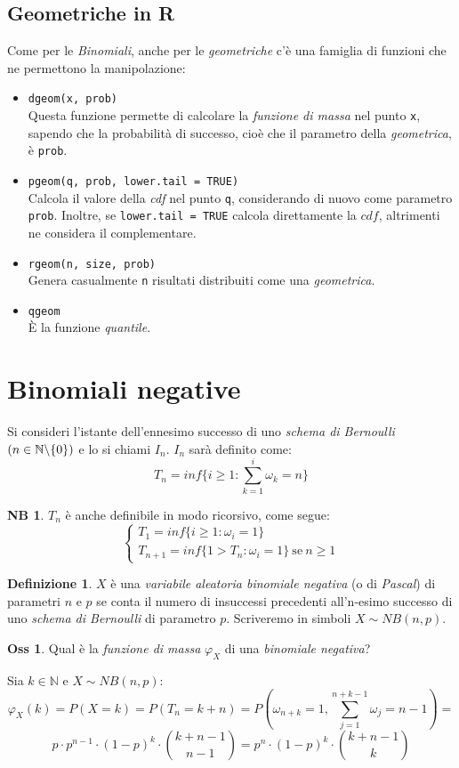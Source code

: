 \documentclass[12pt, a4paper]{report}
\theoremstyle{definition}
\newtheorem{definition}{Definizione}[section]
\newtheorem*{observation}{Oss}
\newtheorem*{note}{NB}
\DeclareRobustCommand{\N}{\mathbb{N}}%
\begin{document}
\subsection{Geometriche in R}
Come per le \emph{Binomiali}, anche per le \emph{geometriche} c'è una famiglia di
funzioni che ne permettono la manipolazione:
\begin{itemize}
	\item \texttt{dgeom(x, prob)}\\
	Questa funzione permette di calcolare la \emph{funzione di massa} nel punto
	\texttt{x}, sapendo che la probabilità di successo, cioè che il parametro
	della \emph{geometrica}, è \texttt{prob}.
	\item \texttt{pgeom(q, prob, lower.tail = TRUE)}\\
	Calcola il valore della \emph{cdf} nel punto \texttt{q}, considerando di nuovo
	come parametro \texttt{prob}. Inoltre, se \texttt{lower.tail = TRUE} calcola
	direttamente la $cdf$, altrimenti ne considera il complementare.
	\item \texttt{rgeom(n, size, prob)}\\
	Genera casualmente \texttt{n} risultati distribuiti come una \emph{geometrica}.
	\item \texttt{qgeom}\\
	È la funzione \emph{quantile}.
\end{itemize}

\section{Binomiali negative}
Si consideri l'istante dell'ennesimo successo di uno \emph{schema di Bernoulli}
\((n\in\N\symbol{92}\{0\})\) e lo si chiami $I_n$. $I_n$ sarà definito come:
\[T_n=inf\{i\geq 1:\sum_{k=1}^i\omega_k=n\}\]
\begin{note}
	$T_n$ è anche definibile in modo ricorsivo, come segue:
	\[\begin{cases}
		T_1=inf\{i\geq 1:\omega_i=1\}\\
		T_{n+1}=inf\{1>T_n:\omega_i=1\}\ \text{se}\ n\geq 1
	\end{cases}\]
\end{note}

\begin{definition}
	$X$ è una \emph{variabile aleatoria binomiale negativa} (o di \emph{Pascal})
	di parametri $n$ e $p$ se conta il numero di insuccessi precedenti all'n-esimo
	successo di uno \emph{schema di Bernoulli} di parametro $p$. Scriveremo in
	simboli \(X\sim NB(n,p).\)
\end{definition}
\begin{observation}
	Qual è la \emph{funzione di massa} $\varphi_X$ di una \emph{binomiale negativa}?

	Sia \(k\in\N\) e \(X\sim NB(n,p)\):
	\[\varphi_X(k)=P(X=k)=P(T_n=k+n)=P\left(\omega_{n+k}=1, \sum_{j=1}^{n+k-1}
	\omega_j=n-1\right)=\]
	\[p\cdot p^{n-1}\cdot (1-p)^k\cdot \binom{k+n-1}{n-1}=p^n\cdot (1-p)^k\cdot \binom{k+n-1}{k}\]
\end{observation}
\end{document}
